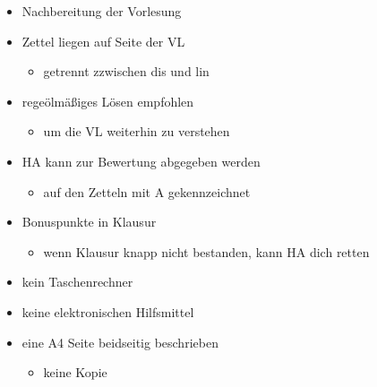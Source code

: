 \documentclass{../tudscript}
\begin{document}
\begin{itemize}
\tightlist
\item
  Nachbereitung der Vorlesung
\item
  Zettel liegen auf Seite der VL

  \begin{itemize}
  \tightlist
  \item
    getrennt zzwischen dis und lin
  \end{itemize}
\item
  regeölmäßiges Lösen empfohlen

  \begin{itemize}
  \tightlist
  \item
    um die VL weiterhin zu verstehen
  \end{itemize}
\item
  HA kann zur Bewertung abgegeben werden

  \begin{itemize}
  \tightlist
  \item
    auf den Zetteln mit A gekennzeichnet
  \end{itemize}
\item
  Bonuspunkte in Klausur

  \begin{itemize}
  \tightlist
  \item
    wenn Klausur knapp nicht bestanden, kann HA dich retten
  \end{itemize}
\end{itemize}

\hypertarget{hilfsmittel-bei-klausur}{%
\label{hilfsmittel-bei-klausur}}

\begin{itemize}
\tightlist
\item
  kein Taschenrechner
\item
  keine elektronischen Hilfsmittel
\item
  eine A4 Seite beidseitig beschrieben

  \begin{itemize}
  \tightlist
  \item
    keine Kopie
  \end{itemize}
\end{itemize}

\hypertarget{literaturempfehlung}{%
\label{literaturempfehlung}}
\end{document}
